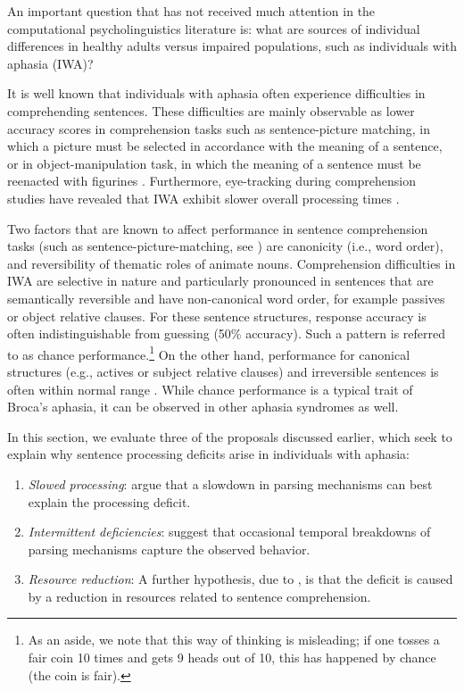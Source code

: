 \documentclass{cambridge7A}\usepackage[]{graphicx}\usepackage[]{color}
\begin{document}
An important question that has not received much attention in the computational psycholinguistics literature is: what are sources of individual differences in healthy adults versus impaired populations, such as individuals with aphasia (IWA)? 

It is well known that individuals with aphasia often experience difficulties in comprehending sentences. These difficulties are mainly observable as lower accuracy scores in comprehension tasks such as sentence-picture matching, in which a picture must be selected in accordance with the meaning of a sentence, or in object-manipulation task, in which the meaning of a sentence must be reenacted with figurines \citep[see literature review in][]{PatilEtAl2016}. Furthermore, eye-tracking during comprehension studies have revealed that IWA exhibit slower overall processing times \citep{hanneetal11}.

Two factors that are known to affect performance in sentence comprehension tasks (such as sentence-picture-matching, see \citealp{hanneetal11}) are canonicity (i.e., word order), and reversibility of thematic roles of animate nouns. Comprehension difficulties in IWA are selective in nature and particularly pronounced in sentences that are semantically reversible and have non-canonical word order, for example passives or object relative clauses. For these sentence structures, response accuracy is often indistinguishable from guessing (50\% accuracy). Such a pattern is referred to as chance performance.\footnote{As an aside, we note that this way of thinking is misleading; if one tosses a fair coin 10 times and gets 9 heads out of 10, this has happened by chance (the coin is fair).} On the other hand, performance for canonical structures (e.g., actives or subject relative clauses) and irreversible sentences is often within normal range \citep{hanneetal11}. While chance performance is a typical trait of Broca's aphasia, it can be observed in other aphasia syndromes as well.

In this section, we evaluate three of the proposals discussed earlier, which seek to explain why sentence processing deficits arise in individuals with aphasia:

\begin{enumerate}
 \item \textit{Slowed processing}:
  \cite{BurkhardtEtAl2003} argue that a slowdown in parsing mechanisms can best explain the processing deficit.  
\ \item \textit{Intermittent deficiencies}:
  \cite{CaplanEtAl2015} suggest that occasional temporal breakdowns of parsing mechanisms capture the observed behavior. 
  \item \textit{Resource reduction}:
  A further hypothesis, due to \cite{Caplan2012}, is that the deficit is caused by a reduction in resources related to sentence comprehension. 
\end{enumerate} 
\end{document}
